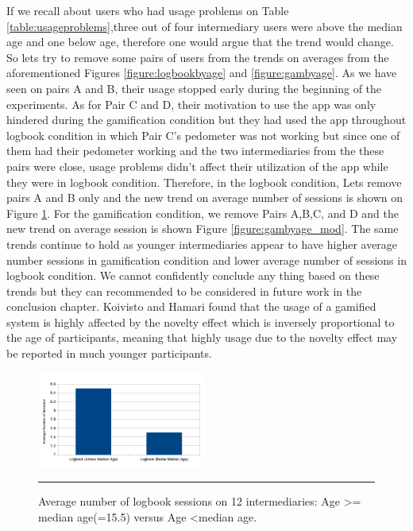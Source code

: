 If we recall about users who had usage problems on Table \ref{table:usageproblems},three out of four intermediary users were above the median age and one below age, therefore one would argue that the trend would change. So lets try to remove some pairs of users from the trends on averages from the aforementioned  Figures \ref{figure:logbookbyage} and \ref{figure:gambyage}. As we have seen on pairs A and B, their usage stopped early during the beginning of the experiments. As for Pair C and D, their motivation to use the app was only hindered during the  gamification condition but they had used the app throughout logbook condition in which Pair C's pedometer was not working but since one of them had their pedometer working and the two intermediaries from the these pairs were close, usage problems didn't affect their utilization of the app while they were in logbook condition. Therefore, in the logbook condition, Lets remove pairs A and B only and the new trend on average number of sessions is shown on Figure \ref{figure:logbookbyage_mod}. For the gamification condition, we remove Pairs A,B,C, and D and the new trend on average session is shown Figure \ref{figure:gambyage_mod}. The same trends continue to hold as younger intermediaries appear to have higher average number sessions in gamification condition and lower average number of sessions in logbook condition. We cannot confidently conclude any thing based on these trends but they can recommended to be considered in future work in the conclusion chapter. Koivisto and Hamari \cite{koivisto2014demographic} found that the usage of  a gamified system is highly affected by the novelty effect which is inversely proportional to the age of participants, meaning that highly usage due to the novelty effect may be reported in much younger participants.   
\newline
\begin{figure}[htbp]
  \centering
    \includegraphics[width=0.5\textwidth]{Figures/logbookbyage_mod.png}
    \rule{35em}{0.5pt}
  \caption{Average number of logbook sessions on  12 intermediaries: Age \textgreater= median age(=15.5) versus Age \textless median age.}
  \label{figure:logbookbyage_mod}
\end{figure}\newline

